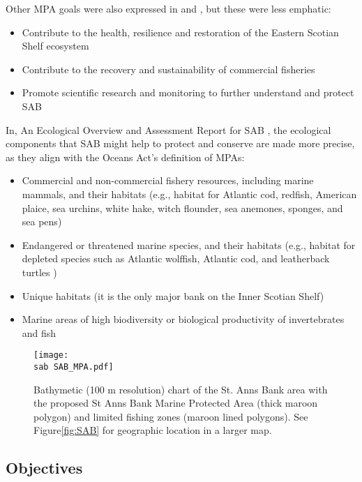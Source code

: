 \documentclass[letterpaper,portrait,11pt]{scrartcl}
\numberwithin{equation}{section}		%
\numberwithin{figure}{section}		%
\numberwithin{table}{section}				%
\newcommand{\ecomod}{\string~/ecomod_data/}   %
\newcommand{\sab}{\ecomod/mpa/sab/}   %
\newcommand{\analysis}{\ecomod/mpa/analysis/}   %
\begin{document}
Other MPA goals were also expressed in \textcite{DFO:2012:conservation} and \textcite{Kenchington:2013:sab}, but these were less emphatic:

\begin{itemize}
	\item Contribute to the health, resilience and restoration of the Eastern Scotian Shelf ecosystem
	\item Contribute to the recovery and sustainability of commercial fisheries 
	\item Promote scientific research and monitoring to further understand and protect SAB
\end{itemize}

In, An Ecological Overview and Assessment Report for SAB \parencite{Ford:2013:sab},  the ecological components that SAB might help to protect and conserve are made more precise, as they align with the Oceans Act's definition of MPAs:

\begin{itemize}
	\item Commercial and non-commercial fishery resources, including marine mammals, and their habitats (e.g., habitat for Atlantic cod, redfish, American plaice, sea urchins, white hake, witch flounder, sea anemones, sponges, and sea pens)
  \item Endangered or threatened marine species, and their habitats (e.g., habitat for depleted species such as Atlantic wolffish, Atlantic cod, and leatherback turtles )
  \item Unique habitats (it is the only major bank on the Inner Scotian Shelf)
  \item Marine areas of high biodiversity or biological productivity of invertebrates and fish
\end{itemize}

\begin{figure}[h]
  \label{fig:SABCloseup}
  \centering
  \texttt{[image: \\sab SAB\_MPA.pdf]}
  \caption{Bathymetic (100 m resolution) chart of the  St. Anns Bank area with the proposed St Anns Bank Marine Protected Area (thick maroon polygon) and limited fishing zones (maroon lined polygons). See Figure\ref{fig:SAB} for geographic location in a larger map.}
\end{figure}

\subsection{Objectives}
\end{document}
